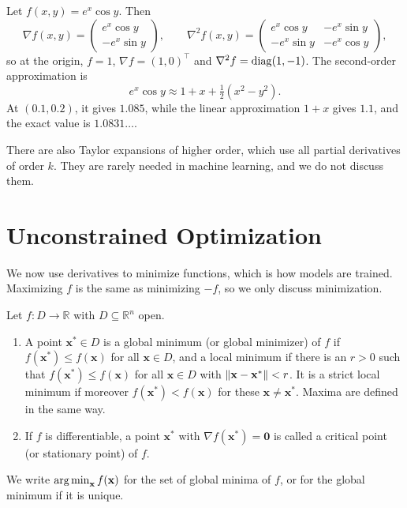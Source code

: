 \begin{example}\label{L3-ex:taylor2}
    Let $f(x, y) = e^x \cos y$. Then
    \[\nabla f(x, y) = \begin{pmatrix} e^x\cos y \\ -e^x\sin y \end{pmatrix}, \qquad \nabla^2 f(x, y) = \begin{pmatrix} e^x\cos y & -e^x\sin y \\ -e^x\sin y & -e^x\cos y \end{pmatrix},\]
    so at the origin, $f = 1$, $\nabla f = (1, 0)^\top$ and $\nabla^2 f = \operatorname{diag}(1, -1)$. The second-order approximation is
    \[e^x \cos y \approx 1 + x + \tfrac{1}{2}(x^2 - y^2).\]
    At $(0.1, 0.2)$, it gives $1.085$, while the linear approximation $1 + x$ gives $1.1$, and the exact value is $1.0831\ldots$.
\end{example}

There are also Taylor expansions of higher order, which use all partial derivatives of order $k$. They are rarely needed in machine learning, and we do not discuss them.

\section{Unconstrained Optimization}\label{L3-sec:optimization}

We now use derivatives to minimize functions, which is how models are trained. Maximizing $f$ is the same as minimizing $-f$, so we only discuss minimization.

\begin{definition}\label{L3-def:minimum}
    Let $f: D \to \mathbb{R}$ with $D \subseteq \mathbb{R}^n$ open.
    \begin{enumerate}
        \item A point $\mathbf{x}^* \in D$ is a global minimum (or global minimizer) of $f$ if $f(\mathbf{x}^*) \leq f(\mathbf{x})$ for all $\mathbf{x} \in D$, and a local minimum if there is an $r > 0$ such that $f(\mathbf{x}^*) \leq f(\mathbf{x})$ for all $\mathbf{x} \in D$ with $\lVert \mathbf{x} - \mathbf{x}^* \rVert < r$. It is a strict local minimum if moreover $f(\mathbf{x}^*) < f(\mathbf{x})$ for these $\mathbf{x} \neq \mathbf{x}^*$. Maxima are defined in the same way.
        \item If $f$ is differentiable, a point $\mathbf{x}^*$ with $\nabla f(\mathbf{x}^*) = \mathbf{0}$ is called a critical point (or stationary point) of $f$.
    \end{enumerate}
    We write $\operatorname*{arg\,min}_{\mathbf{x}} f(\mathbf{x})$ for the set of global minima of $f$, or for the global minimum if it is unique.
\end{definition}

